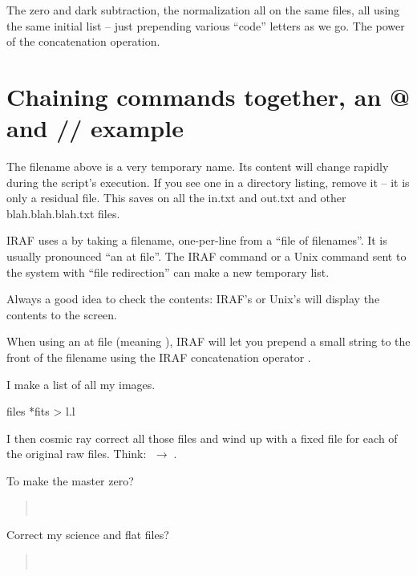 \documentclass[letter,11pt,oneside]{article}
\newcommand{\menu}{\ensuremath{\;\rightarrow\;}}
\begin{document}
The zero and dark subtraction, the normalization all on the same files,
all using the same initial list -- just prepending various ``code'' letters
as we go. The power of the concatenation {\color{verbcolor}{\verb#//#}}
operation.

\section{Chaining commands together, an @ and // example}

The filename {\color{verbcolor}{\verb#l.l#}} above is a very temporary
name. Its content will change rapidly during the script's execution. If
you see one in a directory listing, remove it -- it is only a residual file.
This saves on all the in.txt and out.txt and other blah.blah.blah.txt files.

\gls{IRAF} uses a {\color{verbcolor}{\verb#@filename#}} by taking a
filename, one-per-line from a ``file of filenames''. It is usually
pronounced ``an at file''. The IRAF command {\color{verbcolor}{\verb#files -1 *Bias*fits > l.l#}}
or a Unix command sent to the system
{\color{verbcolor}{\verb#!ls -1 *Bias*fits > l.l#}} with ``file redirection''
can make a new temporary list.

Always a good idea to check the contents: IRAF's
{\color{verbcolor}{\verb#type l.l#}} or Unix's
{\color{verbcolor}{\verb#cat l.l#}} will display the contents to the
screen.

When using an at file (meaning {\color{verbcolor}{\verb#@l.l#}}),
IRAF will let you prepend a small string to the front of the filename
using the IRAF concatenation operator {\color{verbcolor}{\verb#//#}}.

I make a list of all my images.

files *fits > l.l

I then cosmic ray correct all those files and wind up with a fixed
file for each of the original raw files. Think:
{\color{verbcolor}{\verb#a.fits#}} \menu {\color{verbcolor}{\verb#c_a.fits#}}.


To make the master zero?

\begin{quote}
{\color{verbcolor}{\verb#hselect c_*fits $I "(IMAGETYP == 'zero')" > l.l#}} \\
{\color{verbcolor}{\verb#imcombine @l.l zmaster.fits combine=mode#}}
\end{quote}

Correct my science and flat files?

\begin{quote}
{\color{verbcolor}{\verb#hselect c_*fits $I "(IMAGETYP == 'OBJECT' || IMAGETYP == 'flat')" > l.l#}} \\
{\color{verbcolor}{\verb#imarith @l.l - zmaster.fits z_@l.l#}}
\end{quote}
\end{document}
